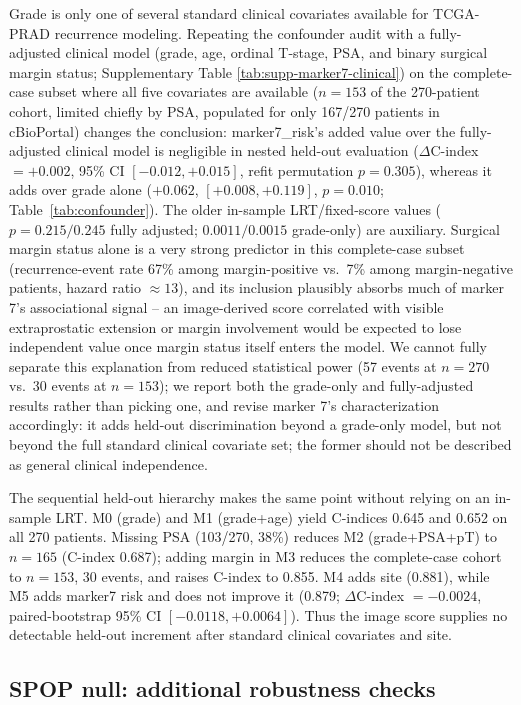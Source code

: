 Grade is only one of several standard clinical covariates available for TCGA-PRAD recurrence
modeling. Repeating the confounder audit with a fully-adjusted clinical model (grade, age,
ordinal T-stage, PSA, and binary surgical margin status; Supplementary Table
\ref{tab:supp-marker7-clinical}) on the complete-case subset where all five covariates are
available ($n=153$ of the 270-patient cohort, limited chiefly by PSA, populated for only
167/270 patients in cBioPortal) changes the conclusion: marker7\_risk's added value over the
fully-adjusted clinical model is negligible in nested held-out evaluation ($\Delta$C-index
$=+0.002$, 95\% CI $[-0.012,+0.015]$, refit permutation $p=0.305$), whereas it adds over
grade alone ($+0.062$, $[+0.008,+0.119]$, $p=0.010$; Table~\ref{tab:confounder}). The older
in-sample LRT/fixed-score values ($p=0.215/0.245$ fully adjusted;
$0.0011/0.0015$ grade-only) are auxiliary. Surgical margin status alone is a very
strong predictor in this complete-case subset (recurrence-event rate 67\% among
margin-positive vs.\ 7\% among margin-negative patients, hazard ratio $\approx 13$), and its
inclusion plausibly absorbs much of marker 7's associational signal -- an image-derived score
correlated with visible extraprostatic extension or margin involvement would be expected to
lose independent value once margin status itself enters the model. We cannot fully separate
this explanation from reduced statistical power (57 events at $n=270$ vs.\ 30 events at
$n=153$); we report both the grade-only and fully-adjusted results rather than picking one, and
revise marker 7's characterization accordingly: it adds held-out discrimination beyond a
grade-only model, but not beyond the full standard clinical covariate set; the former should
not be described as general clinical independence.

The sequential held-out hierarchy makes the same point without relying on an in-sample LRT.
M0 (grade) and M1 (grade+age) yield C-indices 0.645 and 0.652 on all 270 patients. Missing PSA
(103/270, 38\%) reduces M2 (grade+PSA+pT) to $n=165$ (C-index 0.687); adding margin in M3
reduces the complete-case cohort to $n=153$, 30 events, and raises C-index to 0.855. M4 adds
site (0.881), while M5 adds marker7 risk and does not improve it (0.879;
$\Delta$C-index $=-0.0024$, paired-bootstrap 95\% CI $[-0.0118,+0.0064]$). Thus the image
score supplies no detectable held-out increment after standard clinical covariates and site.

\subsection{SPOP null: additional robustness checks}

